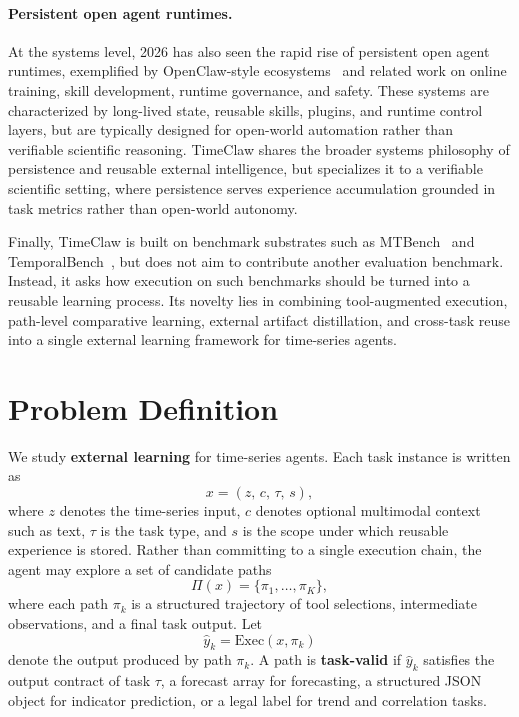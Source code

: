 \paragraph{Persistent open agent runtimes.}
At the systems level, 2026 has also seen the rapid rise of persistent open agent runtimes, exemplified by OpenClaw-style ecosystems~\cite{openclawrl,cuaskill,clawkeeper,clawsafety,safeclawr} and related work on online training, skill development, runtime governance, and safety. These systems are characterized by long-lived state, reusable skills, plugins, and runtime control layers, but are typically designed for open-world automation rather than verifiable scientific reasoning. TimeClaw shares the broader systems philosophy of persistence and reusable external intelligence, but specializes it to a verifiable scientific setting, where persistence serves experience accumulation grounded in task metrics rather than open-world autonomy.

Finally, TimeClaw is built on benchmark substrates such as MTBench~\cite{mtbench} and TemporalBench~\cite{temporalbench}, but does not aim to contribute another evaluation benchmark. Instead, it asks how execution on such benchmarks should be turned into a reusable learning process. Its novelty lies in combining tool-augmented execution, path-level comparative learning, external artifact distillation, and cross-task reuse into a single external learning framework for time-series agents.


\section{Problem Definition}
\label{sec:problem}

We study \textbf{external learning} for time-series agents. Each task instance is written as
\begin{equation}
x = (z,\, c,\, \tau,\, s),
\end{equation}
where $z$ denotes the time-series input, $c$ denotes optional multimodal context such as text, $\tau$ is the task type, and $s$ is the scope under which reusable experience is stored. Rather than committing to a single execution chain, the agent may explore a set of candidate paths
\begin{equation}
\Pi(x) = \{\pi_1,\ldots,\pi_K\},
\end{equation}
where each path $\pi_k$ is a structured trajectory of tool selections, intermediate observations, and a final task output. Let
\begin{equation}
\hat{y}_k = \mathrm{Exec}(x,\pi_k)
\end{equation}
denote the output produced by path $\pi_k$. A path is \textbf{task-valid} if $\hat{y}_k$ satisfies the output contract of task $\tau$, \eg a forecast array for forecasting, a structured JSON object for indicator prediction, or a legal label for trend and correlation tasks.


